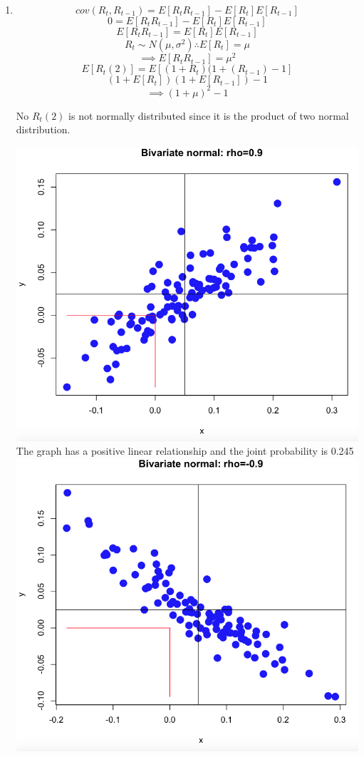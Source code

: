 \documentclass[letterpaper,12pt]{article}
\begin{document}
\begin{enumerate}
\item \[
	cov(R_t,R_{t-1}) = E[R_tR_{t-1}] - E[R_t]E[R_{t-1}]
\]
\[
	0 = E[R_tR_{t-1}] - E[R_t]E[R_{t-1}]
\]
\[
	E[R_tR_{t-1}] = E[R_t]E[R_{t-1}]
\]
\[
	R_t \sim N(\mu,\sigma^2) \therefore E[R_t] = \mu
\]
\[
	\implies E[R_tR_{t-1}] = \mu^2
\]
\[
	E[R_t(2)] = E[(1+R_t)(1+(R_{t-1}) - 1]
\]
\[
	(1 + E[R_t])(1+E[R_{t-1}]) - 1
\]
\[
	\implies (1+\mu)^2 - 1
\]

No $R_t(2)$ is not normally distributed since it is the product of two normal distribution. 

\includegraphics[scale = 0.5]{Positive} \\
The graph has a positive linear relationship and the joint probability is 0.245 \\
\includegraphics[scale = 0.5]{Negative} \\

\end{enumerate}
\end{document}
